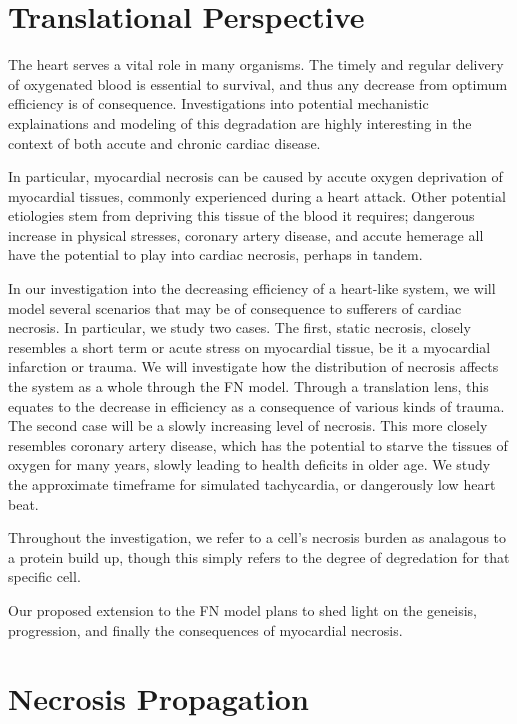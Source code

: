 \documentclass[11pt]{report}
\begin{document}
\section{Translational Perspective} %

The heart serves a vital role in many organisms. The timely and regular delivery of oxygenated blood is essential to survival, and thus any decrease from optimum efficiency is of consequence. Investigations into potential mechanistic explainations and modeling of this degradation are highly interesting in the context of both accute and chronic cardiac disease.

In particular, myocardial necrosis can be caused by accute oxygen deprivation of myocardial tissues, commonly experienced during a heart attack. Other potential etiologies stem from depriving this tissue of the blood it requires; dangerous increase in physical stresses, coronary artery disease, and accute hemerage all have the potential to play into cardiac necrosis, perhaps in tandem. 

In our investigation into the decreasing efficiency of a heart-like system, we will model several scenarios that may be of consequence to sufferers of cardiac necrosis. In particular, we study two cases. The first, static necrosis, closely resembles a short term or acute stress on myocardial tissue, be it a myocardial infarction or trauma. We will investigate how the distribution of necrosis affects the system as a whole through the FN model. Through a translation lens, this equates to the decrease in efficiency as a consequence of various kinds of trauma. The second case will be a slowly increasing level of necrosis. This more closely resembles coronary artery disease, which has the potential to starve the tissues of oxygen for many years, slowly leading to health deficits in older age. We study the approximate timeframe for simulated tachycardia, or dangerously low heart beat. 

Throughout the investigation, we refer to a cell's necrosis burden as analagous to a protein build up, though this simply refers to the degree of degredation for that specific cell.

Our proposed extension to the FN model plans to shed light on the geneisis, progression, and finally the consequences of myocardial necrosis. 

\section{Necrosis Propagation}
\end{document}
